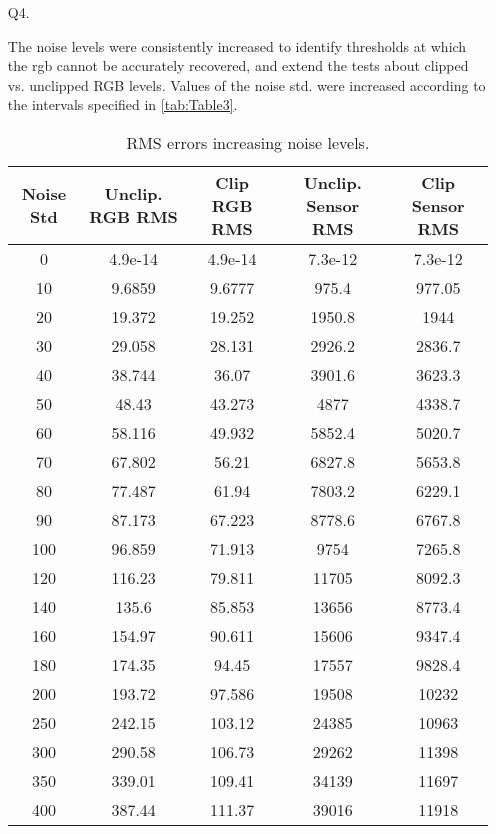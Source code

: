 \documentclass[12pt]{report}
\begin{document}
\begin{enumerate}
    \item[Q4.]

    The noise levels were consistently increased to identify thresholds at which the rgb cannot be accurately recovered, and 
    extend the tests about clipped vs. unclipped RGB levels. Values of the noise std. were increased according to the intervals 
    specified in \autoref{tab:Table3}.

    \begin{table}[h!]
    \begin{center}
    \begin{tabular}{| c | c | c | c | c |} 
        \hline
        Noise Std & Unclip. RGB RMS & Clip RGB RMS & Unclip. Sensor RMS & Clip Sensor RMS\\ 
        \hline \hline
        0  &  4.9e-14 & 4.9e-14 & 7.3e-12 & 7.3e-12  \\ 
        10 &  9.6859 &   9.6777 &  975.4 &  977.05  \\ 
        20 &  19.372 &   19.252 & 1950.8 & 1944  \\ 
        30 &  29.058 &   28.131 & 2926.2 & 2836.7  \\ 
        40 &  38.744 &    36.07 & 3901.6 & 3623.3  \\ 
        50 &   48.43 &   43.273 &   4877 & 4338.7  \\ 
        60 &  58.116 &   49.932 & 5852.4 & 5020.7  \\ 
        70 &  67.802 &    56.21 & 6827.8 & 5653.8  \\ 
        80 &  77.487 &    61.94 & 7803.2 & 6229.1  \\ 
        90 &  87.173 &   67.223 & 8778.6 & 6767.8  \\ 
        100 & 96.859 &   71.913 &   9754 & 7265.8  \\ 
        120 & 116.23 &   79.811 &  11705 & 8092.3  \\ 
        140 &  135.6 &   85.853 &  13656 & 8773.4  \\ 
        160 & 154.97 &   90.611 &  15606 & 9347.4  \\ 
        180 & 174.35 &    94.45 &  17557 & 9828.4  \\ 
        200 & 193.72 &   97.586 &  19508 & 10232  \\ 
        250 & 242.15 &   103.12 &  24385 & 10963  \\ 
        300 & 290.58 &   106.73 &  29262 & 11398  \\ 
        350 & 339.01 &   109.41 &  34139 & 11697  \\ 
        400 & 387.44 &   111.37 &  39016 & 11918  \\ 
        \hline
    \end{tabular}
    \caption{RMS errors increasing noise levels.}
    \label{tab:Table3}
    \end{center}
    \end{table}


\end{enumerate}
\end{document}

